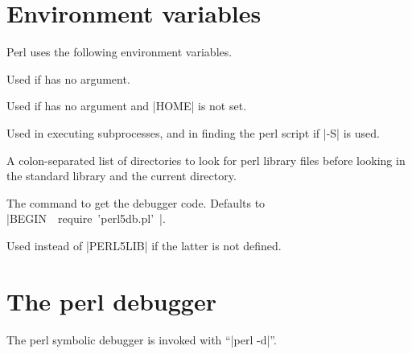 \section{Environment variables} 

Perl uses the following environment variables.

\begin{enum}{1.5cm}

Used if  has no argument.

Used if  has no argument and |HOME| is not set.

Used in executing subprocesses, and in finding the perl script if |-S|
is used.

A colon-separated list of directories to look for perl library files
before looking in the standard library and the current directory.\ddag

The command to get the debugger code. Defaults to 
\hbox{|BEGIN { require 'perl5db.pl' }|}.\ddag 

Used instead of |PERL5LIB| if the latter is not defined.

\end{enum}


\section{The perl debugger} 

The perl symbolic debugger is invoked with ``|perl -d|''.

